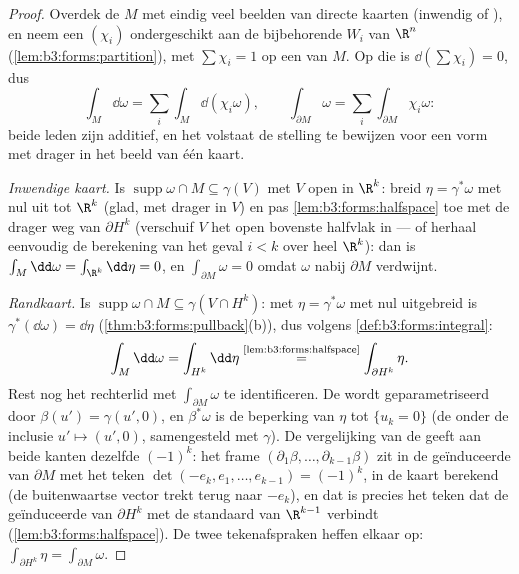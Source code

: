 \begin{proof}
Overdek de  $M$ met eindig veel beelden van directe
kaarten (inwendig of ), en neem een 
$(\chi_i)$ ondergeschikt aan de bijbehorende 
$W_i$ van $\R^n$ (\cref{lem:b3:forms:partition}), met
$\sum\chi_i = 1$ op een  van $M$. Op die  is
$\dd(\sum\chi_i) = 0$, dus
\[
\int_M\dd\omega = \sum_i\int_M\dd(\chi_i\omega),
\qquad
\int_{\partial M}\omega =
\sum_i\int_{\partial M}\chi_i\omega :
\]
beide leden zijn additief, en het volstaat de stelling te
bewijzen voor een vorm met drager in het beeld van één kaart.

\emph{Inwendige kaart.} Is $\operatorname{supp}\omega \cap M
\subseteq \gamma(V)$ met $V$ open in $\R^k$: breid $\eta =
\gamma^*\omega$ met nul uit tot $\R^k$ (glad, met  drager
in $V$) en pas \cref{lem:b3:forms:halfspace} toe met de drager
weg van $\partial H^k$ (verschuif $V$ het open bovenste halfvlak
in --- of herhaal eenvoudig de berekening van het geval $i < k$
over heel $\R^k$): dan is $\int_M\dd\omega = \int_{\R^k}\dd\eta =
0$, en $\int_{\partial M}\omega = 0$ omdat $\omega$ nabij
$\partial M$ verdwijnt.

\emph{Randkaart.} Is $\operatorname{supp}\omega\cap M \subseteq
\gamma(V \cap H^k)$: met $\eta = \gamma^*\omega$ met nul
uitgebreid is $\gamma^*(\dd\omega) = \dd\eta$
(\cref{thm:b3:forms:pullback}(b)), dus volgens
\cref{def:b3:forms:integral}:
\[
\int_M\dd\omega = \int_{H^k}\dd\eta
\overset{\text{\cref{lem:b3:forms:halfspace}}}{=}
\int_{\partial H^k}\eta .
\]
Rest nog het rechterlid met $\int_{\partial M}\omega$ te
identificeren. De  wordt geparametriseerd door $\beta(u') =
\gamma(u', 0)$, en $\beta^*\omega$ is de beperking van $\eta$ tot
$\{u_k = 0\}$ (de  onder de inclusie $u' \mapsto
(u', 0)$, samengesteld met $\gamma$). De vergelijking van de
 geeft aan beide kanten dezelfde $(-1)^k$: het frame
$(\partial_1\beta, \dots, \partial_{k-1}\beta)$ zit in de
geïnduceerde  van $\partial M$ met het teken
$\det(-e_k, e_1, \dots, e_{k-1}) = (-1)^k$, in de kaart berekend
(de buitenwaartse vector trekt terug naar $-e_k$), en dat is
precies het teken dat de geïnduceerde  van $\partial
H^k$ met de standaard van $\R^{k-1}$ verbindt
(\cref{lem:b3:forms:halfspace}). De twee tekenafspraken heffen
elkaar op: $\int_{\partial H^k}\eta = \int_{\partial M}\omega$.
\end{proof}

